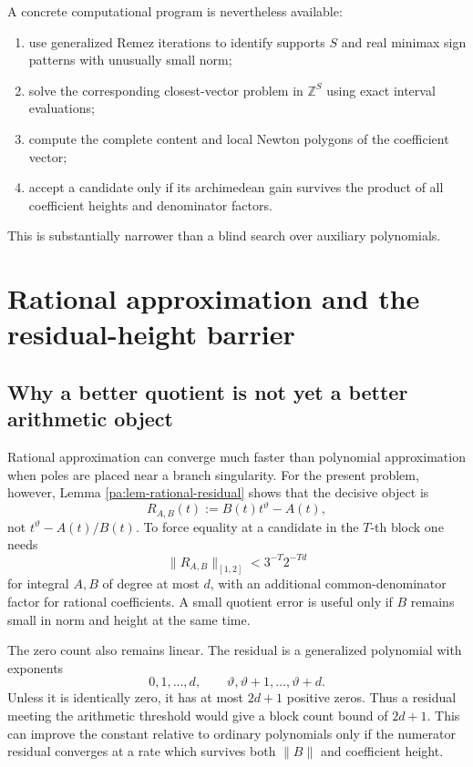 \documentclass[11pt,oneside]{article}
\theoremstyle{definition}
\theoremstyle{remark}
\newcommand{\Z}{\mathbb Z}
\newcommand{\thetaq}{\vartheta}
\begin{document}
A concrete computational program is nevertheless available:
\begin{enumerate}
\item use generalized Remez iterations to identify supports \(S\) and real minimax sign
patterns with unusually small norm;
\item solve the corresponding closest-vector problem in \(\Z^S\) using exact interval
evaluations;
\item compute the complete content and local Newton polygons of the coefficient vector;
\item accept a candidate only if its archimedean gain survives the product of all coefficient
heights and denominator factors.
\end{enumerate}
This is substantially narrower than a blind search over auxiliary polynomials.

\section{Rational approximation and the residual-height barrier}
\label{pa:sec-rational}

\subsection{Why a better quotient is not yet a better arithmetic object}

Rational approximation can converge much faster than polynomial approximation when poles are
placed near a branch singularity.  For the present problem, however, Lemma
\ref{pa:lem-rational-residual} shows that the decisive object is
\[
 R_{A,B}(t):=B(t)t^{\thetaq}-A(t),
\]
not \(t^{\thetaq}-A(t)/B(t)\).  To force equality at a candidate in the \(T\)-th block one
needs
\[
 \|R_{A,B}\|_{[1,2]}<3^{-T}2^{-Td}
\]
for integral \(A,B\) of degree at most \(d\), with an additional common-denominator factor for
rational coefficients.  A small quotient error is useful only if \(B\) remains small in norm
and height at the same time.

The zero count also remains linear.  The residual is a generalized polynomial with exponents
\[
 0,1,\ldots,d,
 \qquad
 \thetaq,\thetaq+1,\ldots,\thetaq+d.
\]
Unless it is identically zero, it has at most \(2d+1\) positive zeros.  Thus a residual meeting
the arithmetic threshold would give a block count bound of \(2d+1\).  This can improve the
constant relative to ordinary polynomials only if the numerator residual converges at a rate
which survives both \(\|B\|\) and coefficient height.
\end{document}

